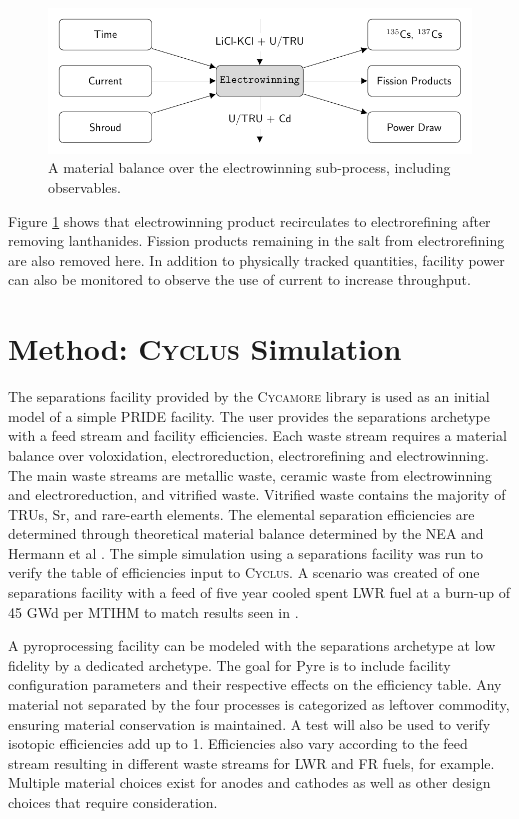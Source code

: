 \documentclass{anstrans}
\newcommand{\Cyclus}{\textsc{Cyclus}\xspace}%
\newcommand{\Cycamore}{\textsc{Cycamore}\xspace}%
\begin{document}
\begin{figure}[ht]
	\centering
	\includegraphics[width=1\linewidth]{winning}
	\caption{A material balance over the electrowinning sub-process, including observables.}
	\label{fig:winning}
\end{figure}

Figure \ref{fig:winning} shows that electrowinning product recirculates to electrorefining after removing lanthanides.
Fission products remaining in the salt from electrorefining are also removed here. In addition to physically tracked 
quantities, facility power can also be monitored to observe the use of current to increase throughput. 
\section{Method: \Cyclus Simulation}
The separations facility provided by the \Cycamore library is used as an 
initial model of a simple \gls{PRIDE} facility. 
The user provides the separations archetype with a feed stream and facility efficiencies.  
Each waste stream requires a material balance over voloxidation, electroreduction, electrorefining and electrowinning. The main 
waste streams are metallic waste, ceramic waste from electrowinning and electroreduction, and vitrified waste. Vitrified 
waste contains the majority of TRUs, Sr, and rare-earth elements. The elemental separation efficiencies are 
determined through theoretical material balance determined by the NEA and Hermann et al \cite{flowsheet_1998,herrmann_separation_2010}. 
The simple simulation using a separations facility was run to verify the table of efficiencies input to \Cyclus. A scenario was 
created of one separations facility with a feed of five year cooled spent LWR 
fuel at a burn-up of 45 \gls{GWd} per \gls{MTIHM} to 
match results seen in \cite{flowsheet_1998}.

A pyroprocessing facility can be modeled with the separations archetype at low fidelity 
by a dedicated archetype. The goal for Pyre is to include facility configuration parameters and 
their respective effects on the efficiency table. Any material not separated by the four processes is categorized as
leftover commodity, ensuring material conservation is maintained. A test will also be used to verify isotopic 
efficiencies add up to 1. Efficiencies also vary according to the feed stream resulting in different 
waste streams for LWR and FR fuels, for example. Multiple material choices exist for anodes and cathodes as well as other 
design choices that require consideration. 
\end{document}
